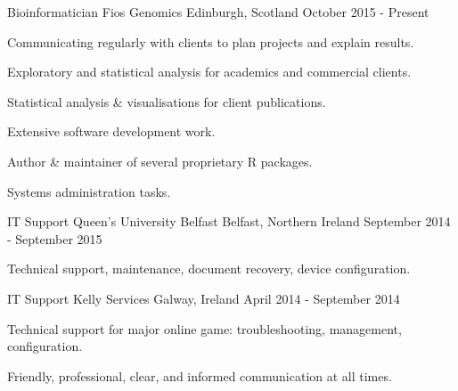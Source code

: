 


\begin{cventries}
\cventry
{Bioinformatician} %
{Fios Genomics} %
{Edinburgh, Scotland} %
{October 2015 - Present} %
{ %
\begin{cvitems}
\item {Communicating regularly with clients to plan projects and explain results.}
\item {Exploratory and statistical analysis for academics and commercial clients.}
\item {Statistical analysis \& visualisations for client publications.}
\item {Extensive software development work.}
\item {Author \& maintainer of several proprietary R packages.}
\item {Systems administration tasks.}
\end{cvitems}
}
\cventry
{IT Support} %
{Queen's University Belfast} %
{Belfast, Northern Ireland} %
{September 2014 - September 2015} %
{ %
\begin{cvitems}
\item {Technical support, maintenance, document recovery, device configuration.}
\end{cvitems}
}
\cventry
{IT Support} %
{Kelly Services} %
{Galway, Ireland} %
{April 2014 - September 2014} %
{ %
\begin{cvitems}
\item {Technical support for major online game: troubleshooting, management, configuration.}
\item {Friendly, professional, clear, and informed communication at all times.}

\end{cvitems}}
\end{cventries}
